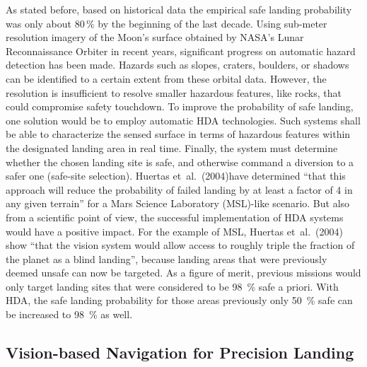\documentclass[%
]{aiaa-tc}
\begin{document}
As stated before, based on historical data the empirical safe landing
probability was only about 80\,\% by the beginning of the last
decade.\cite{Strandmoe1999} Using sub-meter resolution imagery of the Moon's
surface obtained by NASA's Lunar Reconnaissance Orbiter in recent years,
significant progress on automatic hazard detection has been
made.\cite{Brady2010} Hazards such as slopes, craters, boulders, or shadows can
be identified to a certain extent from these orbital data. However, the
resolution is insufficient to resolve smaller hazardous features, like rocks,
that could compromise safety  touchdown. To improve the probability of safe
landing, one solution would be to employ automatic HDA technologies.  Such
systems shall be able to characterize the sensed surface in terms of hazardous
features within the designated landing area in real time. Finally, the system
must determine whether the chosen landing site is safe, and otherwise command a
diversion to a safer one (safe-site selection). Huertas et~al.~(2004)have
determined ``that this approach will reduce the probability of failed landing by
at least a factor of 4 in any given terrain'' for a Mars Science Laboratory
(MSL)-like scenario.\cite{Huertas2007} But also from a scientific point of view,
the successful implementation of HDA systems would have a positive impact.  For
the example of MSL, Huertas et~al.~(2004) show ``that the vision system would
allow access to roughly triple the fraction of the planet as a blind landing'',
because landing areas that were previously deemed unsafe can now be
targeted.\cite{Huertas2007} As a figure of merit, previous missions would only
target landing sites that were considered to be \SI{98}{\percent} safe a priori.
With HDA, the safe landing probability for those areas previously only
\SI{50}{\percent} safe can be increased to \SI{98}{\percent} as well.

\subsection{Vision-based Navigation for Precision Landing}
\end{document}
